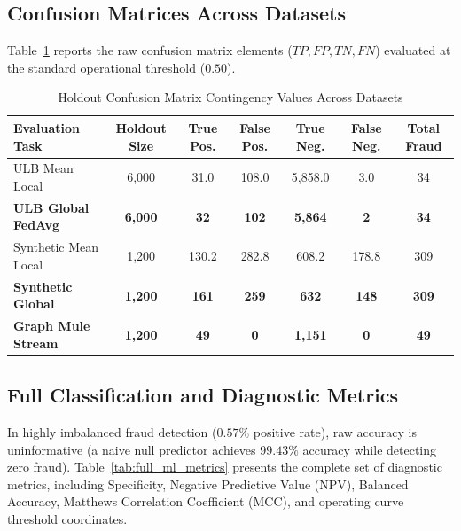 \documentclass[conference]{IEEEtran}
\begin{document}
\subsection{Confusion Matrices Across Datasets}
Table~\ref{tab:confusion_matrices} reports the raw confusion matrix elements ($TP, FP, TN, FN$) evaluated at the standard operational threshold ($0.50$).

\begin{table}[htbp]
\centering
\caption{Holdout Confusion Matrix Contingency Values Across Datasets}
\label{tab:confusion_matrices}
\small
\begin{tabular}{lcccccc}
\toprule
\textbf{Evaluation Task} & \textbf{Holdout Size} & \textbf{True Pos.} & \textbf{False Pos.} & \textbf{True Neg.} & \textbf{False Neg.} & \textbf{Total Fraud} \\
\midrule
ULB Mean Local           & 6,000                 & 31.0               & 108.0               & 5,858.0            & 3.0                 & 34 \\
\textbf{ULB Global FedAvg}& \textbf{6,000}        & \textbf{32}        & \textbf{102}        & \textbf{5,864}     & \textbf{2}          & \textbf{34} \\
\midrule
Synthetic Mean Local     & 1,200                 & 130.2              & 282.8               & 608.2              & 178.8               & 309 \\
\textbf{Synthetic Global}& \textbf{1,200}        & \textbf{161}       & \textbf{259}        & \textbf{632}       & \textbf{148}        & \textbf{309} \\
\midrule
\textbf{Graph Mule Stream}& \textbf{1,200}       & \textbf{49}        & \textbf{0}          & \textbf{1,151}     & \textbf{0}          & \textbf{49} \\
\bottomrule
\end{tabular}
\end{table}

\subsection{Full Classification and Diagnostic Metrics}
In highly imbalanced fraud detection ($0.57\%$ positive rate), raw accuracy is uninformative (a naive null predictor achieves $99.43\%$ accuracy while detecting zero fraud). Table~\ref{tab:full_ml_metrics} presents the complete set of diagnostic metrics, including Specificity, Negative Predictive Value (NPV), Balanced Accuracy, Matthews Correlation Coefficient (MCC), and operating curve threshold coordinates.
\end{document}

